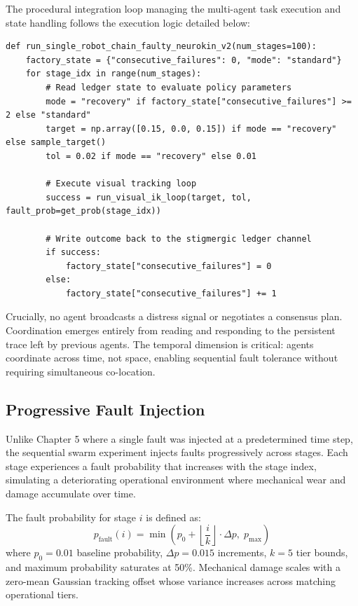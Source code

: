 \documentclass[12pt,a4paper,oneside]{report}
\begin{document}
The procedural integration loop managing the multi-agent task execution and state handling follows the execution logic detailed below:
\begin{minipage}{\linewidth}
\begin{verbatim}
def run_single_robot_chain_faulty_neurokin_v2(num_stages=100):
    factory_state = {"consecutive_failures": 0, "mode": "standard"}
    for stage_idx in range(num_stages):
        # Read ledger state to evaluate policy parameters
        mode = "recovery" if factory_state["consecutive_failures"] >= 2 else "standard"
        target = np.array([0.15, 0.0, 0.15]) if mode == "recovery" else sample_target()
        tol = 0.02 if mode == "recovery" else 0.01
        
        # Execute visual tracking loop
        success = run_visual_ik_loop(target, tol, fault_prob=get_prob(stage_idx))
        
        # Write outcome back to the stigmergic ledger channel
        if success:
            factory_state["consecutive_failures"] = 0
        else:
            factory_state["consecutive_failures"] += 1
\end{verbatim}
\end{minipage}

Crucially, no agent broadcasts a distress signal or negotiates a consensus plan. Coordination emerges entirely from reading and responding to the persistent trace left by previous agents. The temporal dimension is critical: agents coordinate across time, not space, enabling sequential fault tolerance without requiring simultaneous co-location.

\subsection{Progressive Fault Injection}

Unlike Chapter 5 where a single fault was injected at a predetermined time step, the sequential swarm experiment injects faults progressively across stages. Each stage experiences a fault probability that increases with the stage index, simulating a deteriorating operational environment where mechanical wear and damage accumulate over time.

The fault probability for stage $i$ is defined as:
\begin{equation}
p_{\text{fault}}(i) = \min\left(p_0 + \left\lfloor \frac{i}{k} \right\rfloor \cdot \Delta p,\; p_{\text{max}}\right)
\end{equation}
where $p_0 = 0.01$ baseline probability, $\Delta p = 0.015$ increments, $k = 5$ tier bounds, and maximum probability saturates at 50\%. Mechanical damage scales with a zero-mean Gaussian tracking offset whose variance increases across matching operational tiers.
\end{document}
